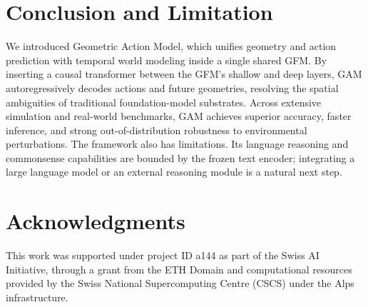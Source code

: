\documentclass{llmxive}
\providecommand{\acknowledgments}{\section*{Acknowledgments}}
\begin{document}
\section{Conclusion and Limitation}
\label{sec:conclusion}
We introduced Geometric Action Model, which unifies geometry and action prediction with temporal world modeling inside a single shared GFM. By inserting a causal transformer between the GFM's shallow and deep layers, GAM autoregressively decodes actions and future geometries, resolving the spatial ambiguities of traditional foundation-model substrates. Across extensive simulation and real-world benchmarks, GAM achieves superior accuracy, faster inference, and strong out-of-distribution robustness to environmental perturbations.
The framework also has limitations. Its language reasoning and commonsense capabilities are bounded by the frozen text encoder; integrating a large language model or an external reasoning module is a natural next step.






% 
\acknowledgments{This work was supported under project ID a144 as part of
the Swiss AI Initiative, through a grant from the ETH Domain and computational
resources provided by the Swiss National Supercomputing Centre (CSCS) under
the Alps infrastructure.}
\end{document}
